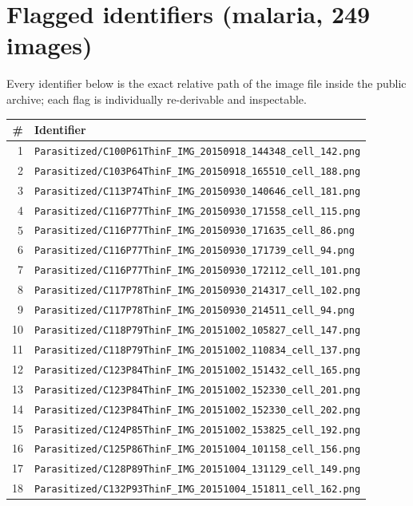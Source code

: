 
\section{Flagged identifiers (malaria, 249 images)}
Every identifier below is the exact relative path of the image file inside
the public archive; each flag is individually re-derivable and inspectable.
\begin{longtable}{r p{12cm}}
\hline \# & Identifier \\ \hline \endhead
1 & \texttt{Parasitized/C100P61ThinF\_IMG\_20150918\_144348\_cell\_142.png} \\
2 & \texttt{Parasitized/C103P64ThinF\_IMG\_20150918\_165510\_cell\_188.png} \\
3 & \texttt{Parasitized/C113P74ThinF\_IMG\_20150930\_140646\_cell\_181.png} \\
4 & \texttt{Parasitized/C116P77ThinF\_IMG\_20150930\_171558\_cell\_115.png} \\
5 & \texttt{Parasitized/C116P77ThinF\_IMG\_20150930\_171635\_cell\_86.png} \\
6 & \texttt{Parasitized/C116P77ThinF\_IMG\_20150930\_171739\_cell\_94.png} \\
7 & \texttt{Parasitized/C116P77ThinF\_IMG\_20150930\_172112\_cell\_101.png} \\
8 & \texttt{Parasitized/C117P78ThinF\_IMG\_20150930\_214317\_cell\_102.png} \\
9 & \texttt{Parasitized/C117P78ThinF\_IMG\_20150930\_214511\_cell\_94.png} \\
10 & \texttt{Parasitized/C118P79ThinF\_IMG\_20151002\_105827\_cell\_147.png} \\
11 & \texttt{Parasitized/C118P79ThinF\_IMG\_20151002\_110834\_cell\_137.png} \\
12 & \texttt{Parasitized/C123P84ThinF\_IMG\_20151002\_151432\_cell\_165.png} \\
13 & \texttt{Parasitized/C123P84ThinF\_IMG\_20151002\_152330\_cell\_201.png} \\
14 & \texttt{Parasitized/C123P84ThinF\_IMG\_20151002\_152330\_cell\_202.png} \\
15 & \texttt{Parasitized/C124P85ThinF\_IMG\_20151002\_153825\_cell\_192.png} \\
16 & \texttt{Parasitized/C125P86ThinF\_IMG\_20151004\_101158\_cell\_156.png} \\
17 & \texttt{Parasitized/C128P89ThinF\_IMG\_20151004\_131129\_cell\_149.png} \\
18 & \texttt{Parasitized/C132P93ThinF\_IMG\_20151004\_151811\_cell\_162.png} \\

\end{longtable}
